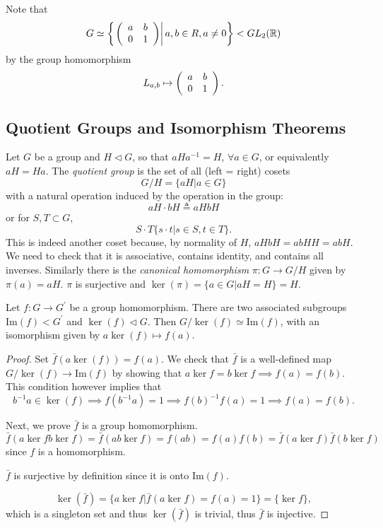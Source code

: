 \documentclass{article}
\begin{document}
Note that
$$
G \simeq \left\{
\left.\left(\begin{array}{c c}
a & b \\ 0 & 1
\end{array}\right)\right| a, b \in R, a \neq 0
\right\} < GL_2(\mathbb{R})
$$
by the group homomorphism
$$
L_{a,b} \mapsto \left(\begin{array}{c c}
a & b \\ 0 & 1
\end{array}\right).
$$

\subsection{Quotient Groups and Isomorphism Theorems}

\begin{defn}
Let $G$ be a group and $H \triangleleft G$, so that $aHa^{-1} = H$,
$\forall a \in G$, or equivalently $aH = Ha$.
The \emph{quotient group} is the set of all (left = right) cosets
$$
G / H = \{ aH | a \in G \}
$$
with a natural operation induced by the operation in the group:
$$
aH \cdot bH \triangleq aHbH
$$
or for $S, T \subset G$,
$$
S \cdot T \{ s \cdot t | s \in S, t \in T \}.
$$
This is indeed another coset because, by normality of $H$,
$aHbH = abHH = abH$. We need to check that it is associative, contains
identity, and contains all inverses. Similarly there is the
\emph{canonical homomorphism} $\pi : G \to G/H$ given by 
$\pi(a) = aH$. $\pi$ is surjective and
$\ker(\pi) = \{ a \in G | aH = H \} = H$.
\end{defn}

\begin{theorem}
Let $f : G \to G^\prime$ be a group homomorphism. There are two
associated subgroups $\mathrm{Im}(f) < G^\prime$ and 
$\ker(f) \triangleleft G$. Then
$G / \ker(f) \simeq \mathrm{Im}(f)$, with an isomorphism given by
$a \ker(f) \mapsto f(a)$.
\end{theorem}
\begin{proof}
Set $\bar{f}(a \ker (f)) = f(a)$. We check that $\bar{f}$ is a
well-defined map $G / \ker(f) \to \mathrm{Im}(f)$ by showing that
$a \ker f = b \ker f \implies f(a) = f(b)$. This condition however
implies that 
$$
b^{-1} a \in \ker(f) 
  \implies f(b^{-1} a) = 1
  \implies f(b)^{-1} f(a) = 1
  \implies f(a) = f(b).
$$

Next, we prove $\bar{f}$ is a group homomorphism.
$$
\bar{f}(a \ker f b \ker f) 
  = \bar{f} (a b \ker f) 
  = f(ab) 
  = f(a)f(b)
  = \bar{f}(a \ker f) \bar{f}(b \ker f)
$$
since $f$ is a homomorphism.

$\bar{f}$ is surjective by definition since it is onto
$\mathrm{Im}(f)$.

$$
\ker(\bar{f}) = \{ a \ker f | \bar{f}(a \ker f) = f(a) = 1 \}
              = \{ \ker f \},
$$
which is a singleton set and thus $\ker(\bar{f})$ is trivial,
thus $\bar{f}$ is injective.
\end{proof}
\end{document}
